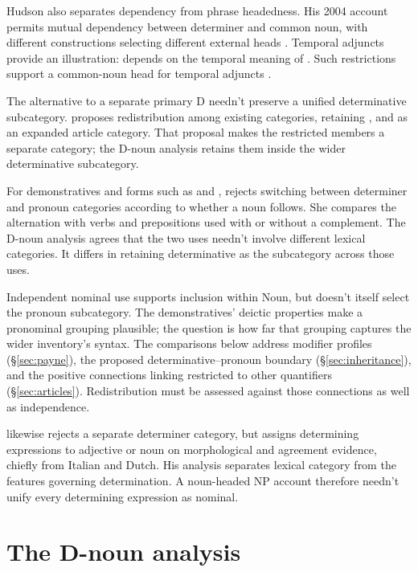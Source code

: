 \documentclass[12pt]{article}
\begin{document}
Hudson also separates dependency from phrase headedness. His 2004 account permits mutual dependency between determiner and common noun, with different constructions selecting different external heads \citep[7--9]{hudson2004determiners}. Temporal adjuncts provide an illustration:  depends on the temporal meaning of . Such restrictions support a common-noun head for temporal adjuncts \citep[10--12]{hudson2004determiners}.

The alternative to a separate primary D needn't preserve a unified determinative subcategory. \textcite{spinillo2004reconceptualising} proposes redistribution among existing categories, retaining ,  and  as an expanded article category. That proposal makes the restricted members a separate category; the D-noun analysis retains them inside the wider determinative subcategory.

For demonstratives and forms such as  and , \textcite[140--144]{spinillo2004reconceptualising} rejects switching between determiner and pronoun categories according to whether a noun follows. She compares the alternation with verbs and prepositions used with or without a complement. The D-noun analysis agrees that the two uses needn't involve different lexical categories. It differs in retaining determinative as the subcategory across those uses.

Independent nominal use supports inclusion within Noun, but doesn't itself select the pronoun subcategory. The demonstratives' deictic properties make a pronominal grouping plausible; the question is how far that grouping captures the wider inventory's syntax. The comparisons below address modifier profiles (§\ref{sec:payne}), the proposed determinative--pronoun boundary (§\ref{sec:inheritance}), and the positive connections linking restricted  to other quantifiers (§\ref{sec:articles}). Redistribution must be assessed against those connections as well as independence.

\textcite{vaneynde2003determiner} likewise rejects a separate determiner category, but assigns determining expressions to adjective or noun on morphological and agreement evidence, chiefly from Italian and Dutch. His analysis separates lexical category from the features governing determination. A noun-headed NP account therefore needn't unify every determining expression as nominal.


\section{The D-noun analysis}\label{sec:proposal}
\end{document}
